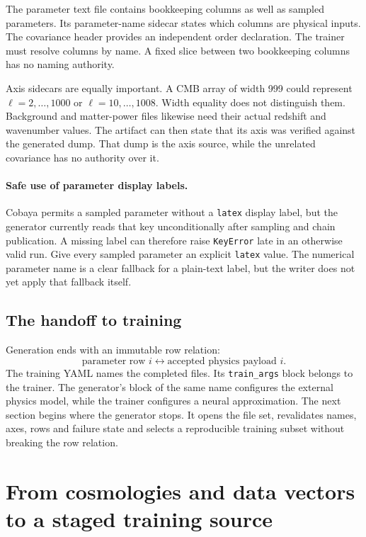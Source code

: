 \documentclass[10pt,aps,prd,twocolumn,nofootinbib]{revtex4-2}
\newcommand{\code}[1]{\texttt{#1}}
\begin{document}
The parameter text file contains bookkeeping columns as well as sampled
parameters.  Its parameter-name sidecar states which columns are physical
inputs.  The covariance header provides an independent order declaration.
The trainer must resolve columns by name.  A fixed slice between two
bookkeeping columns has no naming authority.

Axis sidecars are equally important.  A CMB array of width 999 could represent
\(\ell=2,\ldots,1000\) or \(\ell=10,\ldots,1008\).  Width equality does not
distinguish them.  Background and matter-power files likewise need their
actual redshift and wavenumber values.  The artifact can then state that its
axis was verified against the generated dump.  That dump is the axis source,
while the unrelated covariance has no authority over it.

\paragraph{Safe use of parameter display labels.}
Cobaya permits a sampled parameter without a \code{latex} display label, but
the generator currently reads that key unconditionally after sampling and
chain publication.  A missing label can therefore raise \code{KeyError} late
in an otherwise valid run.  Give every sampled parameter an explicit
\code{latex} value.  The numerical parameter name is a clear fallback for a
plain-text label, but the writer does not yet apply that fallback itself.

\subsection{The handoff to training}

Generation ends with an immutable row relation:
\begin{equation*}
  \text{parameter row }i
  \longleftrightarrow
  \text{accepted physics payload }i.
\end{equation*}
The training YAML names the completed files.  Its \code{train\_args} block
belongs to the trainer.  The generator's block of the same name configures the
external physics model, while the trainer configures a neural approximation.
The next section begins where the generator stops.  It opens the file set,
revalidates names, axes, rows and failure state and selects a reproducible
training subset without breaking the row relation.

\section{From cosmologies and data vectors to a staged training source}
\label{chap:staging}
\end{document}
